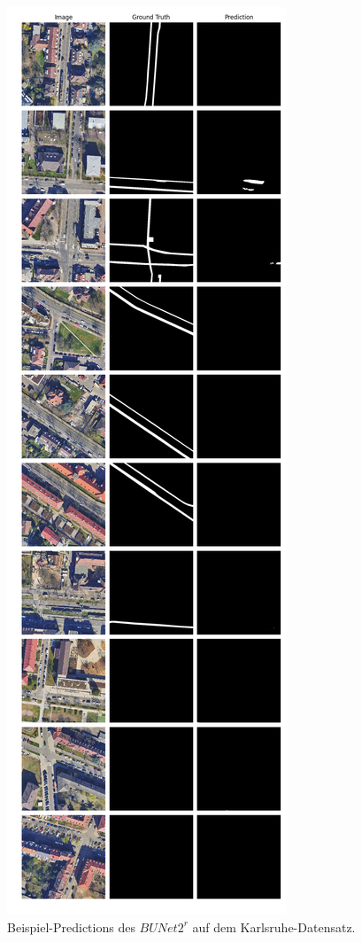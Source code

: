 \begin{figure}
	\centering
	\includegraphics[width=.41\textwidth]{Bilder/Samples-KA/bunet2-r.png} 
	\caption{Beispiel-Predictions des $BUNet2^r$ auf dem Karlsruhe-Datensatz.}
	\label{fig:ka-samples-bunet2-r}
\end{figure}

